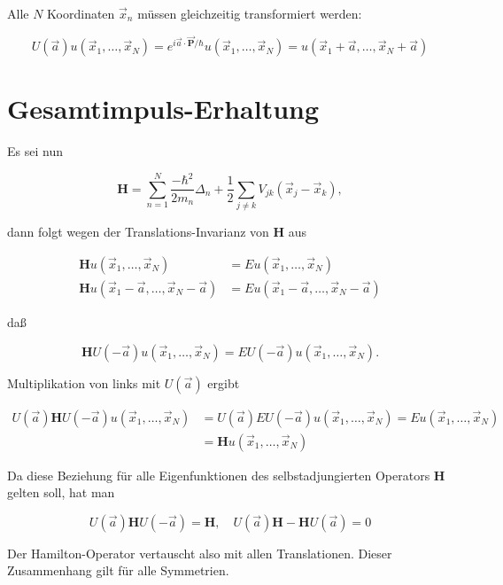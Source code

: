\documentclass[10pt, letterpaper]{article}
\begin{document}
Alle $N$ Koordinaten $\vec{x}_{n}$ müssen gleichzeitig transformiert werden:

$$
U(\vec{a}) u\left(\vec{x}_{1}, \ldots, \vec{x}_{N}\right)=e^{i \vec{a} \cdot \overrightarrow{\mathbf{P}} / \hbar} u\left(\vec{x}_{1}, \ldots, \vec{x}_{N}\right)=u\left(\vec{x}_{1}+\vec{a}, \ldots, \vec{x}_{N}+\vec{a}\right)
$$

\section*{Gesamtimpuls-Erhaltung}
Es sei nun

$$
\mathbf{H}=\sum_{n=1}^{N} \frac{-\hbar^{2}}{2 m_{n}} \Delta_{n}+\frac{1}{2} \sum_{j \neq k} V_{j k}\left(\vec{x}_{j}-\vec{x}_{k}\right),
$$

dann folgt wegen der Translations-Invarianz von $\mathbf{H}$ aus

$$
\begin{aligned}
\mathbf{H} u\left(\vec{x}_{1}, \ldots, \vec{x}_{N}\right) & =E u\left(\vec{x}_{1}, \ldots, \vec{x}_{N}\right) \\
\mathbf{H} u\left(\vec{x}_{1}-\vec{a}, \ldots, \vec{x}_{N}-\vec{a}\right) & =E u\left(\vec{x}_{1}-\vec{a}, \ldots, \vec{x}_{N}-\vec{a}\right)
\end{aligned}
$$

daß

$$
\mathbf{H} U(-\vec{a}) u\left(\vec{x}_{1}, \ldots, \vec{x}_{N}\right)=E U(-\vec{a}) u\left(\vec{x}_{1}, \ldots, \vec{x}_{N}\right) .
$$

Multiplikation von links mit $U(\vec{a})$ ergibt

$$
\begin{aligned}
U(\vec{a}) \mathbf{H} U(-\vec{a}) u\left(\vec{x}_{1}, \ldots, \vec{x}_{N}\right) & =U(\vec{a}) E U(-\vec{a}) u\left(\vec{x}_{1}, \ldots, \vec{x}_{N}\right)=E u\left(\vec{x}_{1}, \ldots, \vec{x}_{N}\right) \\
& =\mathbf{H} u\left(\vec{x}_{1}, \ldots, \vec{x}_{N}\right)
\end{aligned}
$$

Da diese Beziehung für alle Eigenfunktionen des selbstadjungierten Operators $\mathbf{H}$ gelten soll, hat man

$$
U(\vec{a}) \mathbf{H} U(-\vec{a})=\mathbf{H}, \quad U(\vec{a}) \mathbf{H}-\mathbf{H} U(\vec{a})=0
$$

Der Hamilton-Operator vertauscht also mit allen Translationen. Dieser Zusammenhang gilt für alle Symmetrien.
\end{document}
